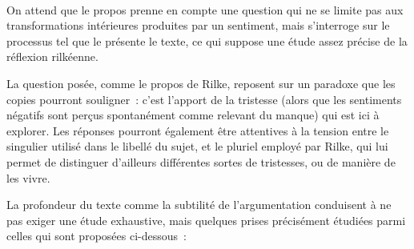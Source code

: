 \vfill{~}\clearpage

{On attend que le propos prenne en compte une question qui ne se limite pas aux
transformations intérieures produites par un sentiment, mais s'interroge sur le
processus tel que le présente le texte, ce qui suppose une étude assez précise de la
réflexion rilkéenne.

La question posée, comme le propos de Rilke, reposent sur un paradoxe que les
copies pourront souligner~: c'est l'apport de la tristesse (alors que les sentiments
négatifs sont perçus spontanément comme relevant du manque) qui est ici à explorer.
Les réponses pourront également être attentives à la tension entre le singulier utilisé
dans le libellé du sujet, et le pluriel employé par Rilke, qui lui permet de distinguer
d'ailleurs différentes sortes de tristesses, ou de manière de les vivre.

La profondeur du texte comme la subtilité de l'argumentation conduisent à ne pas
exiger une étude exhaustive, mais quelques prises précisément étudiées parmi celles
qui sont proposées ci-dessous~:

}

